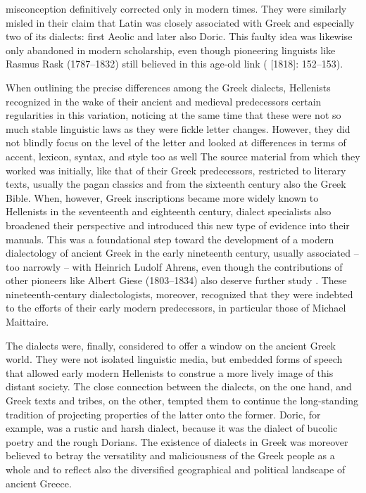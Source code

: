 \documentclass[output=paper]{langsci/langscibook}
\begin{document}
misconception definitively corrected only in modern times. They were similarly misled in their claim that Latin was closely associated with Greek and especially two of its dialects: first Aeolic and later also Doric. This faulty idea was likewise only abandoned in modern scholarship, even though pioneering linguists like Rasmus Rask (1787–1832) still believed in this age-old link (\citealt{Rask2013} [1818]: 152–153).

When outlining the precise differences among the Greek dialects, Hellenists recognized in the wake of their ancient and medieval predecessors certain regularities in this variation, noticing at the same time that these were not so much stable linguistic laws as they were fickle letter changes. However, they did not blindly focus on the level of the letter and looked at differences in terms of accent, lexicon, syntax, and style too as well The source material from which they worked was initially, like that of their Greek predecessors, restricted to literary texts, usually the pagan classics and from the sixteenth century also the Greek Bible. When, however, Greek inscriptions became more widely known to Hellenists in the seventeenth and eighteenth century, dialect specialists also broadened their perspective and introduced this new type of evidence into their manuals. This was a foundational step toward the development of a modern dialectology of ancient Greek in the early nineteenth century, usually associated – too narrowly – with Heinrich Ludolf Ahrens, even though the contributions of other pioneers like Albert Giese (1803–1834) also deserve further study \citep{Giese1837}. These nineteenth-century dialectologists, moreover, recognized that they were indebted to the efforts of their early modern predecessors, in particular those of Michael Maittaire.

The dialects were, finally, considered to offer a window on the ancient Greek world. They were not isolated linguistic media, but embedded forms of speech that allowed early modern Hellenists to construe a more lively image of this distant society. The close connection between the dialects, on the one hand, and Greek texts and tribes, on the other, tempted them to continue the long-standing tradition of projecting properties of the latter onto the former. Doric, for example, was a rustic and harsh dialect, because it was the dialect of bucolic poetry and the rough Dorians. The existence of dialects in Greek was moreover believed to betray the versatility and maliciousness of the Greek people as a whole and to reflect also the diversified geographical and political landscape of ancient Greece.
\end{document}
